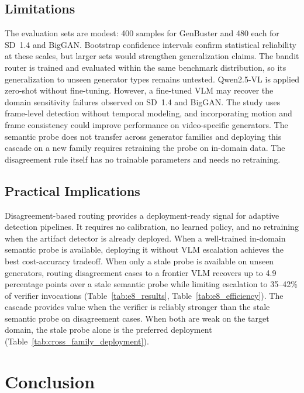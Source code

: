 \documentclass{ieeeaccess}
\begin{document}
\subsection{Limitations}

The evaluation sets are modest: 400 samples for GenBuster and 480 each for SD~1.4
and BigGAN. Bootstrap confidence intervals confirm statistical reliability at these
scales, but larger sets would strengthen generalization claims. The bandit router is
trained and evaluated within the same benchmark distribution, so its generalization
to unseen generator types remains untested. Qwen2.5-VL is applied zero-shot without
fine-tuning. However, a fine-tuned VLM may recover the domain sensitivity failures observed on
SD~1.4 and BigGAN. The study uses frame-level detection without temporal modeling,
and incorporating motion and frame consistency could improve performance on
video-specific generators. The semantic probe does not transfer across generator
families and deploying this cascade on a new family requires retraining the probe on
in-domain data. The disagreement rule itself has no trainable parameters and needs
no retraining.

\subsection{Practical Implications}

Disagreement-based routing provides a deployment-ready signal for adaptive detection
pipelines. It requires no calibration, no learned policy, and no retraining when the
artifact detector is already deployed. When a well-trained in-domain semantic probe
is available, deploying it without VLM escalation achieves the best cost-accuracy
tradeoff. When only a stale probe is available on unseen generators, routing disagreement cases to a frontier VLM recovers up to 4.9 percentage points
over a stale semantic probe while limiting escalation to 35--42\% of verifier
invocations (Table~\ref{tab:e8_results}, Table~\ref{tab:e8_efficiency}).
The cascade provides value when the verifier is reliably stronger than the stale semantic probe on disagreement cases. When both are weak on the target domain, the stale probe alone is the preferred deployment (Table~\ref{tab:cross_family_deployment}).




\section{Conclusion}
\end{document}
